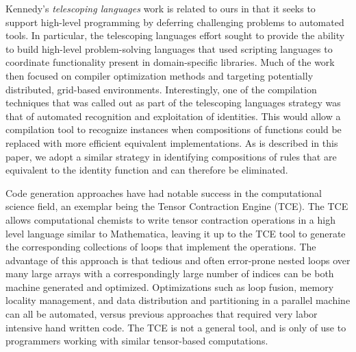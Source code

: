 Kennedy's \emph{telescoping languages} work is related to ours in that it seeks to support high-level programming by deferring challenging problems to automated tools. In particular, the telescoping languages effort sought to provide the ability to build high-level problem-solving languages that used scripting languages to coordinate functionality present in domain-specific libraries\cite{kennedy00telescoping}. Much of the work then focused on compiler optimization methods and targeting potentially distributed, grid-based environments. Interestingly, one of the compilation techniques that was called out as part of the telescoping languages strategy was that of automated recognition and exploitation of identities. This would allow a compilation tool to recognize instances when compositions of functions could be replaced with more efficient equivalent implementations. As is described in this paper, we adopt a similar strategy in identifying compositions of rules that are equivalent to the identity function and can therefore be eliminated.

Code generation approaches have had notable success in the computational science field, an exemplar being the Tensor Contraction Engine (TCE)\cite{baumgartner05synthesis}. The TCE allows computational chemists to write tensor contraction operations in a high level language similar to Mathematica, leaving it up to the TCE tool to generate the corresponding collections of loops that implement the operations. The advantage of this approach is that tedious and often error-prone nested loops over many large arrays with a correspondingly large number of indices can be both machine generated and optimized. Optimizations such as loop fusion, memory locality management, and data distribution and partitioning in a parallel machine can all be automated, versus previous approaches that required very labor intensive hand written code. The TCE is not a general tool, and is only of use to programmers working with similar tensor-based computations.
